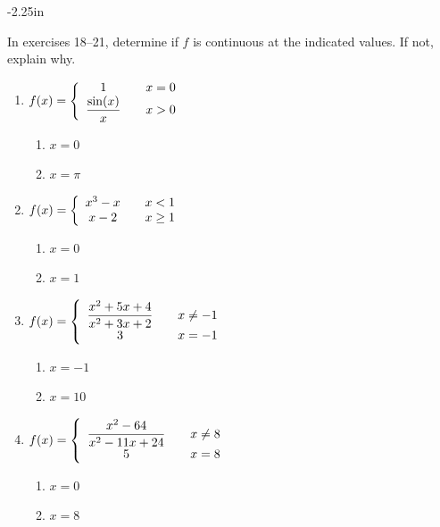 \clearpage

\begin{adjustwidth*}{}{-2.25in}
\setlength{\columnsep}{25pt}
\begin{multicols*}{2}\small

In exercises 18--21, determine if $f$ is continuous at the indicated values.  If not, explain why.

\begin{enumerate}[1),start=18]
\item 
{$\displaystyle f(x) = \left\{\begin{array}{ccc} 
1		& & x=0\\
\displaystyle\frac{\sin(x)}{x} & & x>0
\end{array}\right.
$
\begin{enumerate}
\item		$x=0$
\item		$x=\pi$
\end{enumerate}
}

\item 
{$\displaystyle f(x) = \left\{\begin{array}{ccc} 
x^3-x		& & x<1\\
x-2 & & x\geq 1
\end{array}\right.
$
\begin{enumerate}
\item		$x=0$
\item		$x=1$
\end{enumerate}
}

\item 
{$\displaystyle f(x) = \left\{\begin{array}{ccc} 
\displaystyle\frac{x^2+5x+4}{x^2+3x+2}		& &  x\neq -1\\
3 & & x=-1
\end{array}\right.
$
\begin{enumerate}
\item		$x=-1$
\item		$x=10$
\end{enumerate}
}

\item
{$\displaystyle f(x) = \left\{\begin{array}{ccc}
\displaystyle\frac{x^2-64}{x^2-11 x+24}		& &  x\neq 8\\
5 & & x=8
\end{array}\right.
$
\begin{enumerate}
\item		$x=0$
\item		$x=8$
\end{enumerate}
}
\end{enumerate}


\end{multicols*}
\end{adjustwidth*}

